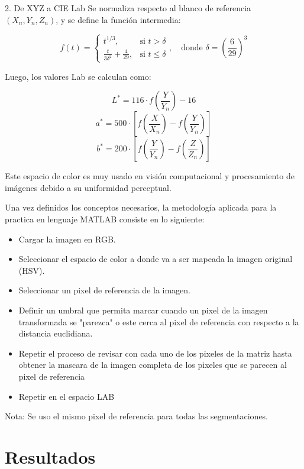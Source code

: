 \documentclass[11pt, letterpaper]{article}
\begin{document}
2. De XYZ a CIE L\*a\*b\: 
Se normaliza respecto al blanco de referencia \( (X_n, Y_n, Z_n) \), y se define la función intermedia:

\[
f(t) =
\begin{cases}
	t^{1/3}, & \text{si } t > \delta \\
	\frac{t}{3\delta^2} + \frac{4}{29}, & \text{si } t \leq \delta
\end{cases}, \quad \text{donde } \delta = \left(\frac{6}{29}\right)^3
\]

Luego, los valores L\*a\*b\* se calculan como:

\[
L^* = 116 \cdot f\left(\frac{Y}{Y_n}\right) - 16
\]
\[
a^* = 500 \cdot \left[ f\left(\frac{X}{X_n}\right) - f\left(\frac{Y}{Y_n}\right) \right]
\]
\[
b^* = 200 \cdot \left[ f\left(\frac{Y}{Y_n}\right) - f\left(\frac{Z}{Z_n}\right) \right]
\]

Este espacio de color es muy usado en visión computacional y procesamiento de imágenes debido a su uniformidad perceptual.


Una vez definidos los conceptos necesarios, la metodología aplicada para la practica en lenguaje MATLAB consiste en lo siguiente:

\begin{itemize}
	\item Cargar la imagen en RGB.
	\item Seleccionar el espacio de color a donde va a ser mapeada la imagen original (HSV).
	\item Seleccionar un pixel de referencia de la imagen.
	\item Definir un umbral que permita marcar cuando un pixel de la imagen transformada se "parezca" o este cerca al pixel de referencia con respecto a la distancia euclidiana.
	\item Repetir el proceso de revisar con cada uno de los pixeles de la matriz hasta obtener la mascara de la imagen completa de los pixeles que se parecen al pixel de referencia
	\item Repetir en el espacio LAB
	
\end{itemize}

Nota: Se uso el mismo pixel de referencia para todas las segmentaciones.

\newpage
	
\section{Resultados}
\end{document}
